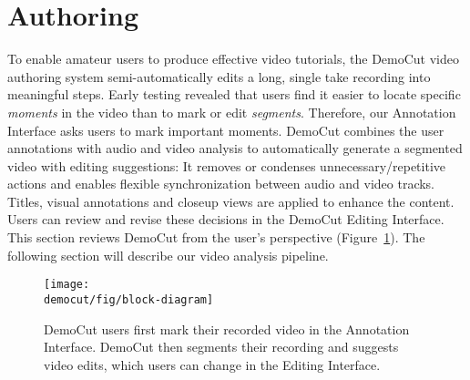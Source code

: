 \section{Authoring}
To enable amateur users to produce effective video tutorials, the DemoCut video authoring system semi-automatically edits a long, single take recording into meaningful steps.
Early testing revealed that users find it easier to locate specific {\em moments} in the video than to mark or edit {\em segments}. Therefore, our Annotation Interface asks users to mark important moments.
%
DemoCut combines the user annotations with audio and video analysis to automatically generate a segmented video with editing suggestions:
%
It removes or condenses unnecessary/repetitive actions and enables flexible synchronization between audio and video tracks.
Titles, visual annotations and closeup views are applied to enhance the content.
%
Users can review and revise these decisions in the DemoCut Editing Interface.
This section reviews DemoCut from the user's perspective (Figure~\ref{fig:block-diagram}). The following section will describe our video analysis pipeline.

\begin{figure}[t]
  \centering
  \texttt{[image: \\democut/fig/block-diagram]}
  \caption{DemoCut users first mark their recorded video in the Annotation Interface. DemoCut then segments their recording and suggests video edits, which users can change in the Editing Interface.}
  \label{fig:block-diagram}
  \vspace{-0.15in}
\end{figure}

